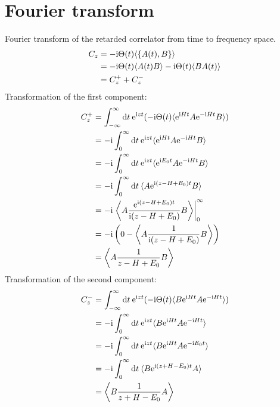 
\chapter{Fourier transform}
\label{app:fourier-transform}

Fourier transform of the retarded correlator from time to frequency space.
\begin{align}
    C_z
     & =
    -\mathrm{i} \Theta(t) \langle \{A(t), B\}\rangle                                 \\
     & =
    -\mathrm{i} \Theta(t) \langle A(t) B\rangle -\mathrm{i} \Theta(t) \langle B A(t)\rangle \\
     & =
    C^+_z + C^-_z
\end{align}
Transformation of the first component:
\begin{align}
    C^+_z
     & =
    \int_{-\infty}^\infty \mathrm{d} t \>
    \mathrm{e}^{\mathrm{i} zt}(-\mathrm{i} \Theta(t) \langle \mathrm{e}^{\mathrm{i} Ht} A \mathrm{e}^{-\mathrm{i} Ht} B\rangle)     \\
     & =
    -\mathrm{i} \int_0^\infty \mathrm{d} t \>
    \mathrm{e}^{\mathrm{i} zt} \langle \mathrm{e}^{\mathrm{i} Ht} A \mathrm{e}^{-\mathrm{i} Ht} B\rangle                     \\
     & =
    -\mathrm{i} \int_0^\infty \mathrm{d} t \>
    \mathrm{e}^{\mathrm{i} zt} \langle \mathrm{e}^{\mathrm{i} E_0t} A \mathrm{e}^{-\mathrm{i} Ht} B\rangle                   \\
     & =
    -\mathrm{i} \int_0^\infty \mathrm{d} t \>
    \langle A \mathrm{e}^{\mathrm{i}(z - H + E_0)t} B\rangle                                     \\
     & =
    -\mathrm{i} \left.\left\langle A \frac{\mathrm{e}^{\mathrm{i}(z - H + E_0)t}}{\mathrm{i}(z - H + E_0)} B\right\rangle
    \right|_0^\infty                                                               \\
     & =
    -\mathrm{i} \left(0 - \left\langle A \frac{1}{\mathrm{i}(z - H + E_0)} B\right\rangle\right) \\
     & =
    \left\langle A \frac{1}{z - H + E_0} B\right\rangle
\end{align}
Transformation of the second component:
\begin{align}
    C^-_z
     & =
    \int_{-\infty}^\infty \mathrm{d} t \>
    \mathrm{e}^{\mathrm{i} zt}(-\mathrm{i} \Theta(t) \langle B \mathrm{e}^{\mathrm{i} Ht} A \mathrm{e}^{-\mathrm{i} Ht}\rangle) \\
     & =
    -\mathrm{i} \int_0^\infty \mathrm{d} t \>
    \mathrm{e}^{\mathrm{i} zt} \langle B \mathrm{e}^{\mathrm{i} Ht} A \mathrm{e}^{-\mathrm{i} Ht}\rangle                 \\
     & =
    -\mathrm{i} \int_0^\infty \mathrm{d} t \>
    \mathrm{e}^{\mathrm{i} zt} \langle B \mathrm{e}^{\mathrm{i} Ht} A \mathrm{e}^{-\mathrm{i} E_0t}\rangle               \\
     & =
    -\mathrm{i} \int_0^\infty \mathrm{d} t \>
    \langle B \mathrm{e}^{\mathrm{i}(z + H - E_0)t} A\rangle                                 \\
     & =
    \left\langle B \frac{1}{z + H - E_0} A\right\rangle
\end{align}
